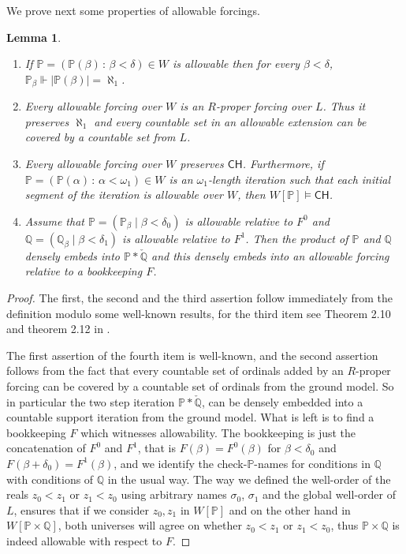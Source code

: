 \documentclass[a4paper,11pt]{article}
\newtheorem{lemma}[theorem]{Lemma}
\newcommand{\forceP}{\mathbb{P}}
\newcommand{\forceQ}{\mathbb{Q}}
\newcommand{\CH}{\mathsf{CH}}
\begin{document}
We prove next some properties of allowable forcings.
 \begin{lemma} 


\begin{enumerate}
\item If $\forceP=(\forceP(\beta) \, : \, \beta < \delta) \in W$ is allowable then for every $\beta < \delta$, $\forceP_{\beta} \Vdash| \forceP(\beta)|= \aleph_1$.
\item Every allowable forcing over $W$ is an $R$-proper forcing over $L$. Thus it preserves $\aleph_1$ and every countable set in an allowable extension can be covered by a countable set from $L$.
\item Every allowable forcing over $W$ preserves $\CH$. Furthermore, if $\forceP= (\forceP(\alpha) \, : \, \alpha < \omega_1) \in W$ is an $\omega_1$-length iteration such that each initial segment of the iteration is allowable over $W$, then $W[\forceP] \models \CH$.
\item Assume that $\forceP=(\forceP_{\beta} \mid \beta <\delta_0)$ is allowable relative to $F^0$ and $\forceQ=(\forceQ_{\beta} \mid \beta < \delta_1)$ is allowable relative to $F^1$. Then the product of $\forceP$ and $\forceQ$ densely embeds into $\forceP \ast \check{\forceQ}$ and this densely embeds into an allowable forcing relative to a bookkeeping $F$.
\end{enumerate}
\end{lemma}
\begin{proof}
The first, the second and the third assertion follow immediately from the definition modulo some well-known results, for the third item see Theorem 2.10 and theorem 2.12 in \cite{Abraham}.

The first assertion of the fourth item is well-known, and the second assertion follows from the fact that  every countable set of ordinals added by an $R$-proper forcing can be covered by a countable set of ordinals from the ground model.
 So in particular the two step iteration $\forceP \ast \check{\forceQ}$, can be densely embedded into a countable support iteration from the ground model.
 What is left is to find a bookkeeping $F$ which witnesses allowability.
 The bookkeeping is just the concatenation of $F^0$ and $F^1$, that is $F(\beta) = F^0 (\beta)$ for $\beta < \delta_0$ and $F(\beta+\delta_0)= F^1(\beta)$, and we identify  the check-$\forceP$-names for conditions in $\forceQ$ with conditions of $\forceQ$ in the usual way. The way we defined the well-order of the reals $z_0 < z_1$ or $z_1 <z_0$ using arbitrary names $\sigma_0$, $\sigma_1$ and the global well-order of $L$, ensures that if  we consider $z_0, z_1$ in $W[\forceP]$ and on the other hand in $W[\forceP \times \forceQ]$, both universes will agree on whether $z_0 < z_1$ or $z_1 < z_0$, thus $\forceP \times \forceQ$ is indeed allowable with respect to $F$.


\end{proof}
\end{document}

